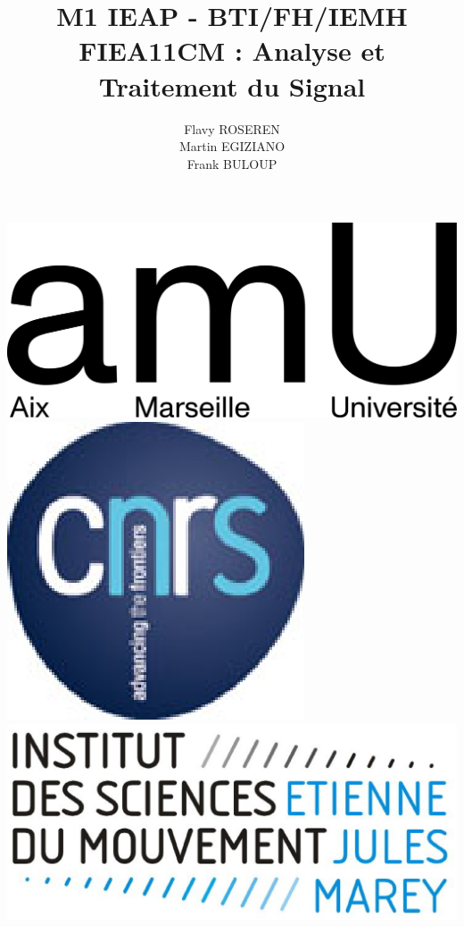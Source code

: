 \documentclass{beamer}
\title{M1 IEAP - BTI/FH/IEMH\\FIEA11CM : Analyse et Traitement du Signal}
\author{Flavy ROSEREN\\Martin EGIZIANO\\Frank BULOUP}
\institute{Aix Marseille Université\\Institut des Sciences du Mouvement}
\date{}
\begin{document}
 
 
\begin{frame}[plain] 
	\titlepage 
	\vspace{1cm}
	\includegraphics[scale=0.6]{images/LogoAMU.png}\hspace*{2cm}
	\includegraphics[scale=0.2]{images/LogoCNRS.eps}\hspace*{2cm}
	\includegraphics[scale=0.1]{images/LogoISM.eps}
\end{frame}
\end{document}
